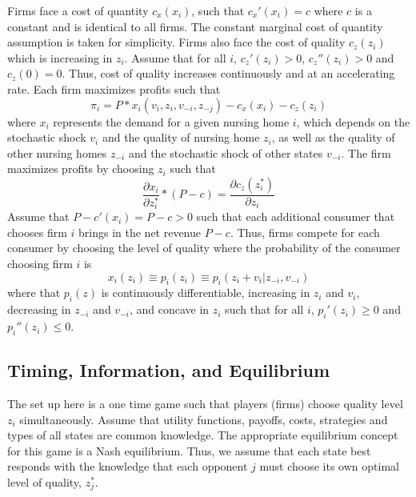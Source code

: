 \documentclass[../Main.tex]{subfiles}
\begin{document}
Firms face a cost of quantity $c_x(x_i)$, such that $c_x'(x_i)=c$ where $c$ is a constant and is identical to all firms. The constant marginal cost of quantity assumption is taken for simplicity. Firms also face the cost of quality $c_z(z_i) $ which is increasing in $z_i$. Assume that for all $i$, $c_z'(z_i)>0$, $c_z''(z_i)>0$ and $c_z(0)=0$. Thus, cost of quality increases continuously and at an accelerating rate. Each firm maximizes profits such that \begin{equation}\pi_i = P*x_i(v_i, z_i, v_{-i}, z_{-j}) -c_x(x_i) -c_z(z_i) \end{equation} 
where $x_i$ represents the demand for a given nursing home $i$, which depends on the stochastic shock $v_i$ and the quality of nursing home $z_i$, as well as the quality of other nursing homes $z_{-i}$ and the stochastic shock of other states $v_{-i}$. The firm maximizes profits by choosing $z_i$ such that \begin{equation} \frac{\partial x_i}{\partial z_i^*}*(P-c)= \frac{\partial c_z(z_i^*)}{\partial z_i} \end{equation} Assume that $P - c'(x_i)= P - c > 0$ such that each additional consumer that chooses firm $i$ brings in the net revenue $P - c$. Thus, firms compete for each consumer by choosing the level of quality where the probability of the consumer choosing firm $i$ is \begin{equation} x_{i}(z_i) \equiv p_i(z_i) \equiv p_i(z_i + v_i |z_{-i}, v_{-i}) \end{equation}
where that $p_{i}(z)$ is continuously differentiable, increasing in $z_i$ and $v_i$, decreasing in $z_{-i}$ and $v_{-i}$, and concave in $z_i$ such that for all $i$, $p_{i}'(z_i)\geq 0$ and $p_{i}''(z_i) \leq 0$.

\subsection{Timing, Information, and Equilibrium}
The set up here is a one time game such that players (firms) choose quality level $z_i$ simultaneously. Assume that utility functions, payoffs, costs, strategies and types of all states are common knowledge. The appropriate equilibrium concept for this game is a Nash equilibrium. Thus, we assume that each state best responds with the knowledge that each opponent $j$ must choose its own optimal level of quality, $z_j^*$.
\end{document}
